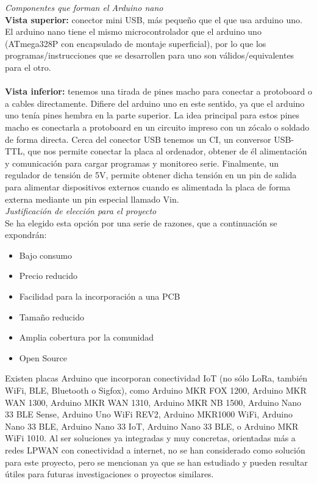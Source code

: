 \documentclass[12pt]{article}
\begin{document}
	\noindent \textit{Componentes que forman el Arduino nano} \\
	
	\noindent \textbf{Vista superior:} conector mini USB, más pequeño que el que usa arduino uno. El arduino nano tiene el mismo microcontrolador que el arduino uno (ATmega328P con encapsulado de montaje superficial), por lo que los programas/instrucciones que se desarrollen para uno son válidos/equivalentes para el otro. \\
	
	 \\
	
	\noindent \textbf{Vista inferior:} tenemos una tirada de pines macho para conectar a protoboard o a cables directamente. Difiere del arduino uno en este sentido, ya que el arduino uno tenía pines hembra en la parte superior. La idea principal para estos pines macho es conectarla a protoboard en un circuito impreso con un zócalo o soldado de forma directa.
	Cerca del conector USB tenemos un CI, un conversor USB-TTL, que nos permite conectar la placa al ordenador, obtener de él alimentación y comunicación para cargar programas y monitoreo serie. Finalmente, un regulador de tensión de 5V, permite obtener dicha tensión en un pin de salida para alimentar dispositivos externos cuando es alimentada la placa de forma externa mediante un pin especial llamado Vin.  \\

	\noindent \textit{Justificación de elección para el proyecto} \\
	
	\noindent Se ha elegido esta opción por una serie de razones, que a continuación se expondrán: \\
	
	\begin{itemize}
		\item Bajo consumo
		\item Precio reducido
		\item Facilidad para la incorporación a una PCB
		\item Tamaño reducido
		\item Amplia cobertura por la comunidad
		\item Open Source
	\end{itemize}
	

	\noindent Existen placas Arduino que incorporan conectividad IoT (no sólo LoRa, también WiFi, BLE, Bluetooth o Sigfox), como Arduino MKR FOX 1200, Arduino MKR WAN 1300, Arduino MKR WAN 1310, Arduino MKR NB 1500, Arduino Nano 33 BLE Sense, Arduino Uno WiFi REV2, Arduino MKR1000 WiFi, Arduino Nano 33 BLE, Arduino Nano 33 IoT, Arduino Nano 33 BLE, o Arduino MKR WiFi 1010.  Al ser soluciones ya integradas y muy concretas, orientadas más a redes LPWAN con conectividad a internet, no se han considerado como solución para este proyecto, pero se mencionan ya que se han estudiado y pueden resultar útiles para futuras investigaciones o proyectos similares.\\
	
\end{document}
